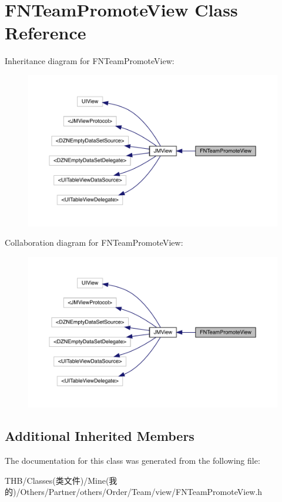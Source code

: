 \hypertarget{interface_f_n_team_promote_view}{}\section{F\+N\+Team\+Promote\+View Class Reference}
\label{interface_f_n_team_promote_view}


Inheritance diagram for F\+N\+Team\+Promote\+View\+:\nopagebreak
\begin{figure}[H]
\begin{center}
\leavevmode
\includegraphics[width=350pt]{interface_f_n_team_promote_view__inherit__graph}
\end{center}
\end{figure}


Collaboration diagram for F\+N\+Team\+Promote\+View\+:\nopagebreak
\begin{figure}[H]
\begin{center}
\leavevmode
\includegraphics[width=350pt]{interface_f_n_team_promote_view__coll__graph}
\end{center}
\end{figure}
\subsection*{Additional Inherited Members}


The documentation for this class was generated from the following file\+:\begin{DoxyCompactItemize}
\item 
T\+H\+B/\+Classes(类文件)/\+Mine(我的)/\+Others/\+Partner/others/\+Order/\+Team/view/F\+N\+Team\+Promote\+View.\+h\end{DoxyCompactItemize}
